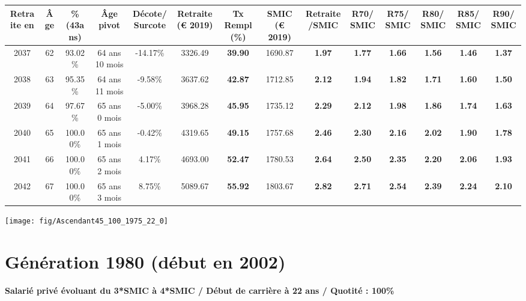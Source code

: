 \begin{adjustbox}{max width=\textwidth} 
\begin{tabular}[htb]{|c|c||c|c|c||c|c||c|c||c|c|c|c|c|} 
\hline 
 Retraite en &  Âge &  \%(43ans) &  Âge pivot &  Décote/Surcote &  Retraite (\euro{} 2019) &  Tx Rempl(\%) &  SMIC (\euro{} 2019) &  Retraite/SMIC &  R70/SMIC &  R75/SMIC &  R80/SMIC &  R85/SMIC &  R90/SMIC \\ 
\hline \hline 
 2037 &  62 &  93.02\% &  64 ans 10 mois &  -14.17\% &  3326.49 &  {\bf 39.90} &  1690.87 &  {\bf 1.97} &  {\bf 1.77} &  {\bf 1.66} &  {\bf 1.56} &  {\bf 1.46} &  {\bf 1.37} \\ 
\hline 
 2038 &  63 &  95.35\% &  64 ans 11 mois &  -9.58\% &  3637.62 &  {\bf 42.87} &  1712.85 &  {\bf 2.12} &  {\bf 1.94} &  {\bf 1.82} &  {\bf 1.71} &  {\bf 1.60} &  {\bf 1.50} \\ 
\hline 
 2039 &  64 &  97.67\% &  65 ans 0 mois &  -5.00\% &  3968.28 &  {\bf 45.95} &  1735.12 &  {\bf 2.29} &  {\bf 2.12} &  {\bf 1.98} &  {\bf 1.86} &  {\bf 1.74} &  {\bf 1.63} \\ 
\hline 
 2040 &  65 &  100.00\% &  65 ans 1 mois &  -0.42\% &  4319.65 &  {\bf 49.15} &  1757.68 &  {\bf 2.46} &  {\bf 2.30} &  {\bf 2.16} &  {\bf 2.02} &  {\bf 1.90} &  {\bf 1.78} \\ 
\hline 
 2041 &  66 &  100.00\% &  65 ans 2 mois &  4.17\% &  4693.00 &  {\bf 52.47} &  1780.53 &  {\bf 2.64} &  {\bf 2.50} &  {\bf 2.35} &  {\bf 2.20} &  {\bf 2.06} &  {\bf 1.93} \\ 
\hline 
 2042 &  67 &  100.00\% &  65 ans 3 mois &  8.75\% &  5089.67 &  {\bf 55.92} &  1803.67 &  {\bf 2.82} &  {\bf 2.71} &  {\bf 2.54} &  {\bf 2.39} &  {\bf 2.24} &  {\bf 2.10} \\ 
\hline 
\hline 
\end{tabular} 
\end{adjustbox} 
 
 \vspace{0.1cm} 

 {\hspace{-2.2cm}\texttt{[image: fig/Ascendant45\_100\_1975\_22\_0]}} 

\newpage 
 
\section{Génération 1980 (début en 2002)\label{Ascendant45_100_1980_22_0}} 
 
{\bf \noindent Salarié privé évoluant du 3*SMIC à 4*SMIC / Début de carrière à 22 ans / Quotité : 100\%}  ~ 

